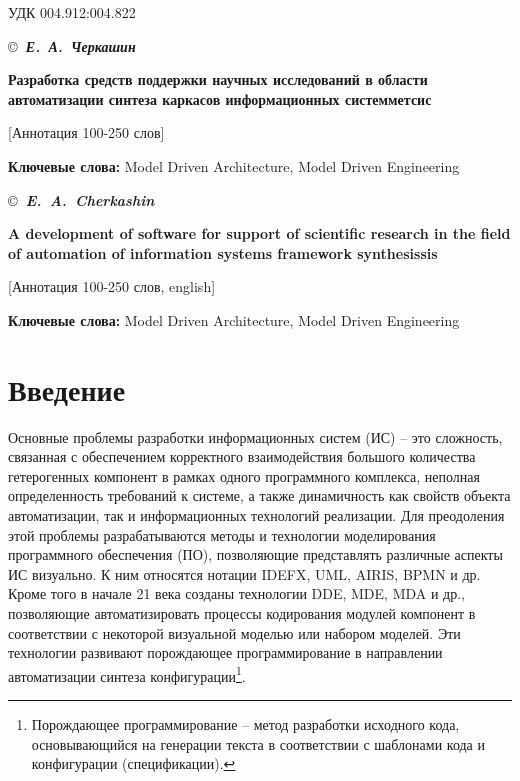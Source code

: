 \documentclass[11pt,draft]{ltxdoc}
\begin{document}
\thispagestyle{empty}

УДК 004.912:004.822

\begingroup
{}\hfill\copyright{}{\itshape\bfseries{}~Е.~А.~Черкашин}
\endgroup

\begin{center}
  {\Large{}\bfseries Разработка средств поддержки научных исследований в области
  автоматизации синтеза каркасов информационных систем{\brill метсис}}



\end{center}

[Аннотация 100-250 слов]

{\bfseries Ключевые слова:} Model Driven Architecture, Model Driven
Engineering
\vspace{1em}

\begingroup
{}\hfill\copyright{}{\itshape\bfseries{}~E.~A.~Cherkashin}
\endgroup

\begin{center}
  {\Large{}\bfseries A development of software for support of scientific research
  in the field of automation of information systems framework synthesis{\brill sis}}

\end{center}

[Аннотация 100-250 слов, english]

{\bfseries Ключевые слова:} Model Driven Architecture, Model Driven
Engineering

\section*{Введение}
\label{sec:intro}

Основные проблемы разработки информационных систем (ИС) -- это сложность,
связанная с обеспечением корректного взаимодействия большого количества гетерогенных компонент в
рамках одного программного комплекса, неполная определенность требований к
системе, а также динамичность как свойств объекта автоматизации, так и
информационных технологий реализации.  Для преодоления этой проблемы
разрабатываются методы и технологии моделирования программного обеспечения (ПО),
позволяющие представлять различные
аспекты ИС визуально.  К ним относятся нотации IDEFX, UML, AIRIS, BPMN и др.  Кроме того
в начале 21 века созданы технологии DDE, MDE, MDA и др., позволяющие автоматизировать процессы
кодирования модулей компонент в соответствии с некоторой визуальной моделью или
набором моделей.  Эти технологии развивают порождающее программирование в
направлении автоматизации синтеза конфигурации\footnote{Порождающее
  программирование -- метод разработки исходного кода, основывающийся на
  генерации текста в соответствии с шаблонами кода и конфигурации (спецификации).}.
\end{document}

